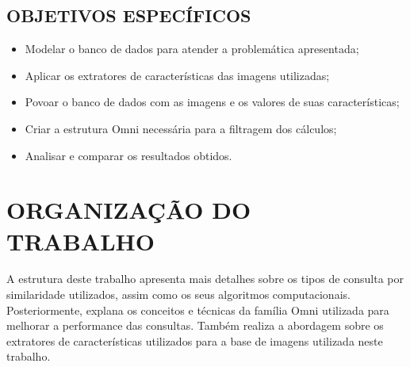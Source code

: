 \subsection{OBJETIVOS ESPECÍFICOS}
\label{subsec:objesp}
\begin{itemize}
 \item Modelar o banco de dados para atender a problemática apresentada;
 \item Aplicar os extratores de características das imagens utilizadas;
 \item Povoar o banco de dados com as imagens e os valores de suas características; %
 \item Criar a estrutura Omni necessária para a filtragem dos cálculos;
 \item Analisar e comparar os resultados obtidos.
\end{itemize}


\section{ORGANIZAÇÃO DO TRABALHO} %
\label{sec:organizacaoTrabalho}

A estrutura deste trabalho apresenta mais detalhes sobre os tipos de consulta por similaridade utilizados, assim como os seus algoritmos computacionais. Posteriormente, explana os conceitos e técnicas da família Omni utilizada para
melhorar a performance das consultas. Também realiza a abordagem sobre os extratores de características utilizados para a base de imagens utilizada neste trabalho.
